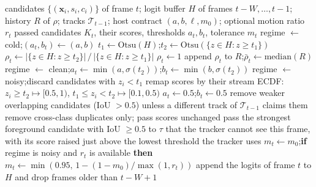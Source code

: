 \begin{algorithm}[tbp]
\caption{Per-frame decision of the self-calibrating control layer (frozen configuration).}
\label{alg:ch5-layer}
\small
\begin{algorithmic}[1]
\Require candidates $\{(\mathbf{x}_i,s_i,c_i)\}$ of frame $t$; logit buffer $H$ of frames $t-W,\ldots,t-1$; history $R$ of $\rho$; tracks $\mathcal{T}_{t-1}$; host contract $(a,b,\ell,m_0)$; optional motion ratio $r_t$
\Ensure passed candidates $K_t$, their scores, thresholds $a_t, b_t$, tolerance $m_t$
  \State regime $\gets$ cold;\quad $(a_t,b_t)\gets(a,b)$
\Else
  \State $t_1 \gets \mathrm{Otsu}(H)$;\quad $t_2 \gets \mathrm{Otsu}(\{z\in H: z\ge t_1\})$
  \State $\rho_t \gets |\{z\in H: z\ge t_2\}| \,/\, |\{z\in H: z\ge t_1\}|$
   
    \State $\rho_t \gets 1$
  \EndIf
  \State append $\rho_t$ to $R$;\quad $\bar\rho_t \gets \mathrm{median}(R)$
    \State regime $\gets$ clean;\quad $a_t \gets \min(a,\sigma(t_2))$;\quad $b_t \gets \min(b,\sigma(t_2))$
  \Else
    \State regime $\gets$ noisy;\quad discard candidates with $z_i<t_1$
    \State remap scores by their stream ECDF: $z_i\ge t_2 \mapsto [0.5,1)$, $t_1\le z_i<t_2 \mapsto [0.1,0.5)$
    \State $a_t \gets 0.5$;\quad $b_t \gets 0.5$
  \EndIf
\EndIf
{}
  \State remove weaker overlapping candidates (IoU $>0.5$) unless a different track of $\mathcal{T}_{t-1}$ claims them
\Else
  \State remove cross-class duplicates only; pass scores unchanged
\EndIf
{}
  \State pass the strongest foreground candidate with IoU $\ge 0.5$ to $\tau$ that the tracker cannot see this frame, with its score raised just above the lowest threshold the tracker uses
\EndFor
\State $m_t \gets m_0$;\quad \textbf{if} regime is noisy and $r_t$ is available \textbf{then} $m_t \gets \min\!\left(0.95,\,1-(1-m_0)/\max(1,r_t)\right)$
\State append the logits of frame $t$ to $H$ and drop frames older than $t-W+1$
\end{algorithmic}
\end{algorithm}

